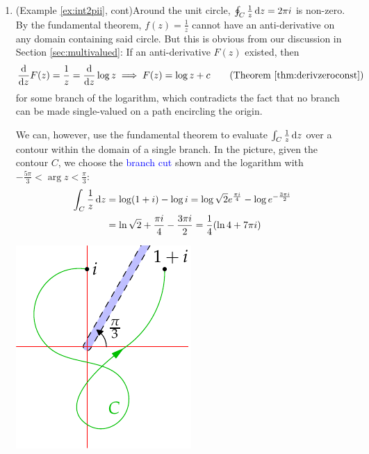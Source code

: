 \begin{examples}{}{}
\begin{enumerate}
	  \item (Example \ref{ex:int2pii}, cont)\lstsp Around the unit circle, $\oint_C\frac 1z\,{\mathrm{d} z}=2\pi i$ is non-zero. By the fundamental theorem, $f(z)=\frac 1z$ cannot have an anti-derivative on any domain containing said circle. But this is obvious from our discussion in Section \ref{sec:multivalued}: If an anti-derivative $F(z)$ existed, then
		\[
			\diff zF(z)=\frac 1z =\diff z\log z \implies F(z)=\log z+c \tag{Theorem \ref{thm:derivzeroconst}}
		\]
		for some branch of the logarithm, which contradicts the fact that no branch can be made single-valued on a path encircling the origin.\par
		\begin{minipage}[t]{0.7\linewidth}\vspace{-10pt}
			We can, however, use the fundamental theorem to evaluate $\int_C\frac 1z\,{\mathrm{d} z}$ over a contour within the domain of a single branch. In the picture, given the contour $C$, we choose the \textcolor{blue}{branch cut} shown and the logarithm with $-\frac{5\pi}3<\arg z<\frac\pi 3$:
			\begin{align*}
				\int_C\frac 1z\,{\mathrm{d} z}&=\log(1+i)-\log i =\log\sqrt 2e^{\frac{\pi i}{4}}-\log e^{-\frac{3\pi i}{2}}\\
				&=\ln\sqrt 2+\frac{\pi i}4-\frac{3\pi i}2=\frac 14(\ln 4+7\pi i)
			\end{align*}
		\end{minipage}
		\hfill
		\begin{minipage}[t]{0.29\linewidth}\vspace{-20pt}
			\flushright\includegraphics[scale=0.95]{contour-branch}
		\end{minipage}
	\end{enumerate}

\end{examples}


